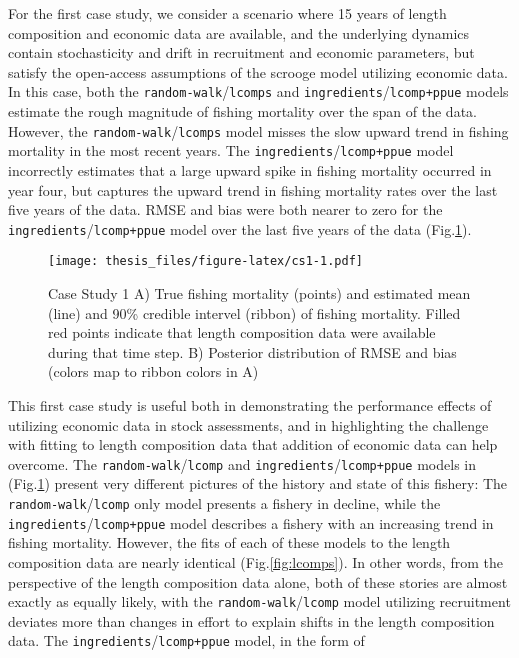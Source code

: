 \documentclass[twoside,12pt,final]{ucthesis-CA2012}
\begin{document}
\begin{ucmainmatter}
For the first case study, we consider a scenario where 15 years of
length composition and economic data are available, and the underlying
dynamics contain stochasticity and drift in recruitment and economic
parameters, but satisfy the open-access assumptions of the scrooge model
utilizing economic data. In this case, both the
\texttt{random-walk}/\texttt{lcomps} and
\texttt{ingredients}/\texttt{lcomp+ppue} models estimate the rough
magnitude of fishing mortality over the span of the data. However, the
\texttt{random-walk}/\texttt{lcomps} model misses the slow upward trend
in fishing mortality in the most recent years. The
\texttt{ingredients}/\texttt{lcomp+ppue} model incorrectly estimates
that a large upward spike in fishing mortality occurred in year four,
but captures the upward trend in fishing mortality rates over the last
five years of the data. RMSE and bias were both nearer to zero for the
\texttt{ingredients}/\texttt{lcomp+ppue} model over the last five years
of the data (Fig.\ref{fig:cs1}).
\begin{figure}
\centering
\texttt{[image: thesis\_files/figure-latex/cs1-1.pdf]}
\caption{\label{fig:cs1}Case Study 1 A) True fishing mortality (points) and
estimated mean (line) and 90\% credible intervel (ribbon) of fishing
mortality. Filled red points indicate that length composition data were
available during that time step. B) Posterior distribution of RMSE and
bias (colors map to ribbon colors in A)}
\end{figure}
This first case study is useful both in demonstrating the performance
effects of utilizing economic data in stock assessments, and in
highlighting the challenge with fitting to length composition data that
addition of economic data can help overcome. The
\texttt{random-walk}/\texttt{lcomp} and
\texttt{ingredients}/\texttt{lcomp+ppue} models in (Fig.\ref{fig:cs1})
present very different pictures of the history and state of this
fishery: The \texttt{random-walk}/\texttt{lcomp} only model presents a
fishery in decline, while the \texttt{ingredients}/\texttt{lcomp+ppue}
model describes a fishery with an increasing trend in fishing mortality.
However, the fits of each of these models to the length composition data
are nearly identical (Fig.\ref{fig:lcomps}). In other words, from the
perspective of the length composition data alone, both of these stories
are almost exactly as equally likely, with the
\texttt{random-walk}/\texttt{lcomp} model utilizing recruitment deviates
more than changes in effort to explain shifts in the length composition
data. The \texttt{ingredients}/\texttt{lcomp+ppue} model, in the form of

\end{ucmainmatter}
\end{document}
